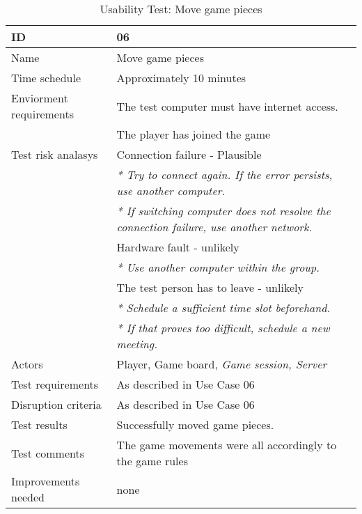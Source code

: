 {\footnotesize
\begin{table}[H]
\begin{tabular}{| p{5cm} | p{10cm} |}\hline
	\textbf{ID}	& \textbf{06} \\ \hline
	Name		& Move game pieces\\ \hline
	Time schedule	& Approximately 10 minutes\\ \hline
	Enviorment requirements 
		& The test computer must have internet access. \\ 
		& The player has joined the game\\ \hline
	Test risk analasys 
		& Connection failure - Plausible \\
		& \emph{* Try to connect again. If the error persists, use another computer.} \\
		& \emph{* If switching computer does not resolve the connection failure, use another network.}\\
		& Hardware fault - unlikely \\
		& \emph{* Use another computer within the group.} \\
		& The test person has to leave - unlikely \\
		& \emph{* Schedule a sufficient time slot beforehand.} \\
		& \emph{* If that proves too difficult, schedule a new meeting.}\\ \hline
	Actors	& Player, Game board, \emph{Game session, Server}\\ \hline
	Test requirements & As described in Use Case 06 \\ \hline
	Disruption criteria & As described in Use Case 06  \\ \hline
	Test results & Successfully moved game pieces.
		& \\ \hline
	Test comments & The game movements were all accordingly to the game rules
		& \\ \hline
	Improvements needed & none
		& \\ \hline
\end{tabular}


\caption{Usability Test: Move game pieces}
\label{fig:usability_test_6}
\end{table}}


